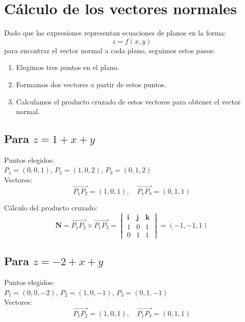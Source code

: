 \documentclass{article}
\begin{document}
\section{Cálculo de los vectores normales}
Dado que las expresiones representan ecuaciones de planos en la forma:
\begin{equation}
    z = f(x, y)
\end{equation}
para encontrar el vector normal a cada plano, seguimos estos pasos:
\begin{enumerate}
    \item Elegimos tres puntos en el plano.
    \item Formamos dos vectores a partir de estos puntos.
    \item Calculamos el producto cruzado de estos vectores para obtener el vector normal.
\end{enumerate}


\subsection{Para $z = 1 + x + y$}
Puntos elegidos: \\ 
$P_1 = (0,0,1)$, $P_2 = (1,0,2)$, $P_3 = (0,1,2)$ \\
Vectores:
\begin{equation*}
    \overrightarrow{P_1P_2} = (1,0,1), \quad \overrightarrow{P_1P_3} = (0,1,1)
\end{equation*}

Cálculo del producto cruzado:
\begin{equation*}
    \mathbf{N} = \overrightarrow{P_1P_2} \times \overrightarrow{P_1P_3} =
    \begin{vmatrix} 
    \mathbf{i} & \mathbf{j} & \mathbf{k} \\
    1 & 0 & 1 \\
    0 & 1 & 1
    \end{vmatrix} = (-1, -1, 1)
\end{equation*}

\subsection{Para $z = -2 + x + y$}
Puntos elegidos: \\ 
$P_1 = (0,0,-2)$, $P_2 = (1,0,-1)$, $P_3 = (0,1,-1)$ \\
Vectores:
\begin{equation*}
    \overrightarrow{P_1P_2} = (1,0,1), \quad \overrightarrow{P_1P_3} = (0,1,1)
\end{equation*}
\end{document}
